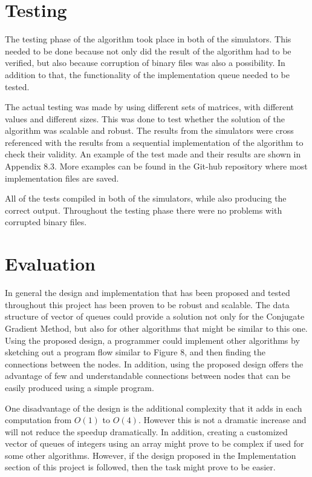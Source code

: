 \documentclass[12pt,twosided]{article}
\begin{document}
\section{Testing}
The testing phase of the algorithm took place in both of the simulators. This needed to be done because not only did the result of the algorithm had to be verified, but also because corruption of binary files was also a possibility. In addition to that, the functionality of the implementation queue needed to be tested.

The actual testing was made by using different sets of matrices, with different values and different sizes. This was done to test whether the solution of the algorithm was scalable and robust. The results from the simulators were cross referenced with the results from a sequential implementation of the algorithm to check their validity. An example of the test made and their results are shown in Appendix 8.3. More examples can be found in the Git-hub repository where most implementation files are saved\cite{git_repo}.

All of the tests compiled in both of the simulators, while also producing the correct output. Throughout the testing phase there were no problems with corrupted binary files.
\section{Evaluation}
In general the design and implementation that has been proposed and tested throughout this project has been proven to be robust and scalable. The data structure of vector of queues could provide a solution not only for the Conjugate Gradient Method, but also for other algorithms that might be similar to this one. Using the proposed design, a programmer could implement other algorithms by sketching out a program flow similar to Figure 8, and then finding the connections between the nodes. In addition, using the proposed design offers the advantage of few and understandable connections between nodes that can be easily produced using a simple program.

One disadvantage of the design is the additional complexity that it adds in each computation from $O(1)$ to $O(4)$. However this is not a dramatic increase and will not reduce the speedup dramatically. In addition, creating a customized vector of queues of integers using an array might prove to be complex if used for some other algorithms. However, if the design proposed in the Implementation section of this project is followed, then the task might prove to be easier.
\end{document}
